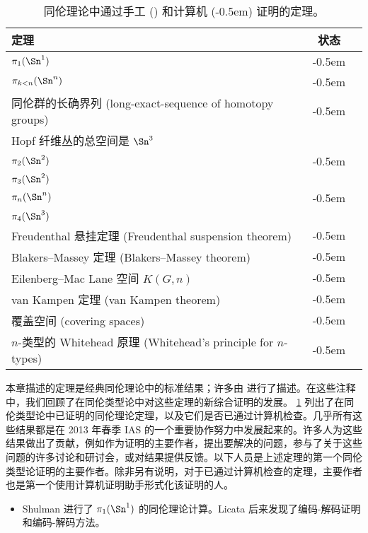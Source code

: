 {{
  \newcommand{\humancheck}{\ding{52}}
  \newcommand{\computercheck}{\ding{52}\kern-0.5em\ding{52}}
  \begin{table}[htb]
    \centering
    \begin{tabular}{lcc}
      \toprule
      定理         & 状态 \\
      \midrule
      $\pi_1(\Sn ^1)$                     & \computercheck \\
      $\pi_{k<n}(\Sn ^n)$                  & \computercheck \\
      同伦群的长确界列 (long-exact-sequence of homotopy groups) & \computercheck    \\
      Hopf 纤维丛的总空间是 $\Sn ^3$ & \humancheck    \\
      $\pi_2(\Sn ^2)$                     & \computercheck \\
      $\pi_3(\Sn ^2)$                     & \humancheck    \\
      $\pi_n(\Sn ^n)$                     & \computercheck \\
      $\pi_4(\Sn ^3)$                     & \humancheck    \\
      Freudenthal 悬挂定理 (Freudenthal suspension theorem)      & \computercheck \\
      Blakers--Massey 定理 (Blakers--Massey theorem)              & \computercheck \\
      Eilenberg--Mac Lane 空间 $K(G,n)$ & \computercheck \\
      van Kampen 定理 (van Kampen theorem)                & \computercheck \\
      覆盖空间 (covering spaces)                     & \computercheck \\
      $n$-类型的 Whitehead 原理 (Whitehead's principle for $n$-types) & \computercheck \\
      \bottomrule
    \end{tabular}
    \caption{同伦理论中通过手工 (\humancheck) 和计算机 (\computercheck) 证明的定理。}
    \label{tab:theorems}
  \end{table}
}

本章描述的定理是经典同伦理论中的标准结果；许多由 \cite{hatcher02topology} 进行了描述。在这些注释中，我们回顾了在同伦类型论中对这些定理的新综合证明的发展。 \cref{tab:theorems} 列出了在同伦类型论中已证明的同伦理论定理，以及它们是否已通过计算机检查。几乎所有这些结果都是在 2013 年春季 IAS 的一个重要协作努力中发展起来的。许多人为这些结果做出了贡献，例如作为证明的主要作者，提出要解决的问题，参与了关于这些问题的许多讨论和研讨会，或对结果提供反馈。以下人员是上述定理的第一个同伦类型论证明的主要作者。除非另有说明，对于已通过计算机检查的定理，主要作者也是第一个使用计算机证明助手形式化该证明的人。
\begin{itemize}
  \item
  Shulman 进行了 $\pi_1(\Sn^1)$ 的同伦理论计算。Licata 后来发现了编码-解码证明和编码-解码方法。


\end{itemize}}
